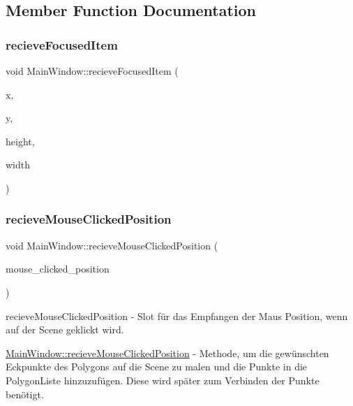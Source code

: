 \subsection{Member Function Documentation}
\mbox{\label{class_main_window_aee13312aef8f1fc2a4c7ff2f8837234c}} 
\subsubsection{\texorpdfstring{recieve\+Focused\+Item}{recieveFocusedItem}}
{\footnotesize\ttfamily void Main\+Window\+::recieve\+Focused\+Item (\begin{DoxyParamCaption}\item[{qreal}]{x,  }\item[{qreal}]{y,  }\item[{qreal}]{height,  }\item[{qreal}]{width }\end{DoxyParamCaption})\hspace{0.3cm}{\ttfamily [slot]}}

\mbox{\label{class_main_window_a3ea2675e6bd470873d7569db47a5bd2a}} 
\subsubsection{\texorpdfstring{recieve\+Mouse\+Clicked\+Position}{recieveMouseClickedPosition}}
{\footnotesize\ttfamily void Main\+Window\+::recieve\+Mouse\+Clicked\+Position (\begin{DoxyParamCaption}\item[{Q\+PointF}]{mouse\+\_\+clicked\+\_\+position }\end{DoxyParamCaption})\hspace{0.3cm}{\ttfamily [slot]}}



recieve\+Mouse\+Clicked\+Position -\/ Slot für das Empfangen der Maus Position, wenn auf der Scene geklickt wird. 

\hyperlink{class_main_window_a3ea2675e6bd470873d7569db47a5bd2a}{Main\+Window\+::recieve\+Mouse\+Clicked\+Position} -\/ Methode, um die gewünschten Eckpunkte des Polygons auf die Scene zu malen und die Punkte in die Polygon\+Liste hinzuzufügen. Diese wird später zum Verbinden der Punkte benötigt.


